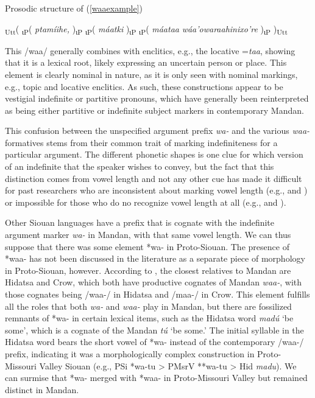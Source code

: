 \begin{exe}
\item Prosodic structure of (\ref{waaexample})

\textsubscript{Utt}( \textsubscript{ιP}( \textit{ptamíihe,} )\textsubscript{ιP} \textsubscript{ιP}( \textit{máatki} )\textsubscript{ιP} \textsubscript{ιP}( \textit{máataa} \textit{wáa'owaraahinixo're} )\textsubscript{ιP} )\textsubscript{Utt}

\end{exe}

This /waa/ generally combines with enclitics, e.g., the locative =\textit{taa}, showing that it is a lexical root, likely expressing an uncertain person or place. This element is clearly nominal in nature, as it is only seen with nominal markings, e.g., topic and locative enclitics. As such, these constructions appear to be vestigial indefinite or partitive pronouns, which have generally been reinterpreted as being either partitive or indefinite subject markers in contemporary Mandan. 


This confusion between the unspecified argument prefix \textit{wa-} and the various \textit{waa-} formatives stems from their common trait of marking indefiniteness for a particular argument. The different phonetic shapes is one clue for which version of an indefinite that the speaker wishes to convey, but the fact that this distinction comes from vowel length and not any other cue has made it difficult for past researchers who are inconsistent about marking vowel length (e.g., \citealt{kennard1936} and \citealt{trechter2012b}) or impossible for those who do no recognize vowel length at all (e.g., \citealt{hollow1970} and \citealt{coberly1979}).

Other Siouan languages have a prefix that is cognate with the indefinite argument marker \textit{wa-} in Mandan, with that same vowel length. We can thus suppose that there was some element *wa- in Proto-Siouan. The presence of *waa- has not been discussed in the literature as a separate piece of morphology in Proto-Siouan, however. According to \citet{kasak2015}, the closest relatives to Mandan are Hidatsa and Crow, which both have productive cognates of Mandan \textit{waa-}, with those cognates being /waa-/ in Hidatsa and /maa-/ in Crow. This element fulfills all the roles that both \textit{wa-} and \textit{waa-} play in Mandan, but there are fossilized remnants of *wa- in certain lexical items, such as the Hidatsa word \textit{madú} `be some', which is a cognate of the Mandan \textit{tú} `be some.' The initial syllable in the Hidatsa word bears the short vowel of *wa- instead of the contemporary /waa-/ prefix, indicating it was a morphologically complex construction in Proto-Missouri Valley Siouan (e.g., PSi *wa-tu > PMsrV **wa-tu > Hid \textit{madu}). We can surmise that *wa- merged with *waa- in Proto-Missouri Valley but remained distinct in Mandan.


